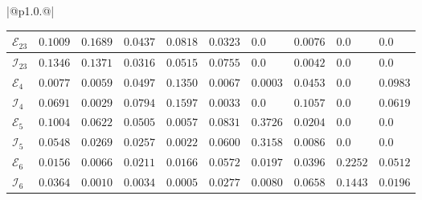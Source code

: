 \documentclass[10pt,a4paper,twoside,american]{article}
\theoremstyle{definitionstyle}
\begin{document}
\begin{table}[H]
\begin{tabular}{|@{\hspace*{\marg}}p{}@{\hspace*{\marg}}|}
{\begin{tabular}{|p{6ex}|p{6ex}|p{6ex}|p{6ex}|p{6ex}|p{6ex}|p{6ex}|p{6ex}|p{6ex}|p{6ex}|}
      $\mathcal{E}_{23}$ & $0.1009$ & $0.1689$ & $0.0437$ & $0.0818$ & $0.0323$ & $0.0$ & $0.0076$ & $0.0$ & $0.0$\\
      \hline
      $\mathcal{I}_{23}$ & $0.1346$ & $0.1371$ & $0.0316$ & $0.0515$ & $0.0755$ & $0.0$ & $0.0042$ & $0.0$ & $0.0$\\
      \hline
      $\mathcal{E}_{4}$ & $0.0077$ & $0.0059$ & $0.0497$ & $0.1350$ & $0.0067$ & $0.0003$ & $0.0453$ & $0.0$ & $0.0983$\\
      \hline
      $\mathcal{I}_{4}$ & $0.0691$ & $0.0029$ & $0.0794$ & $0.1597$ & $0.0033$ & $0.0$ & $0.1057$ & $0.0$ & $0.0619$\\
      \hline
      $\mathcal{E}_{5}$ & $0.1004$ & $0.0622$ & $0.0505$ & $0.0057$ & $0.0831$ & $0.3726$ & $0.0204$ & $0.0$ & $0.0$\\
      \hline
      $\mathcal{I}_{5}$ & $0.0548$ & $0.0269$ & $0.0257$ & $0.0022$ & $0.0600$ & $0.3158$ & $0.0086$ & $0.0$ & $0.0$\\
      \hline
      $\mathcal{E}_{6}$ & $0.0156$ & $0.0066$ & $0.0211$ & $0.0166$ & $0.0572$ & $0.0197$ & $0.0396$ & $0.2252$ & $0.0512$\\
      \hline
      $\mathcal{I}_{6}$ & $0.0364$ & $0.0010$ & $0.0034$ & $0.0005$ & $0.0277$ & $0.0080$ & $0.0658$ & $0.1443$ & $0.0196$\\
      \hline
    \end{tabular}
    }\\
    \\
    \hline
  \end{tabular}\\

\end{table}
\end{document}
